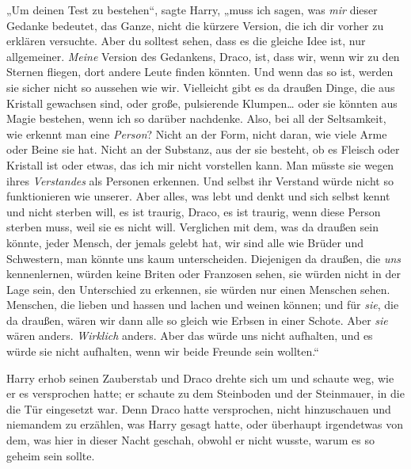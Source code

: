 „Um deinen Test zu bestehen“, sagte Harry, „muss ich sagen, was \emph{mir} dieser Gedanke bedeutet, das Ganze, nicht die kürzere Version, die ich dir vorher zu erklären versuchte. Aber du solltest sehen, dass es die gleiche Idee ist, nur allgemeiner. \emph{Meine} Version des Gedankens, Draco, ist, dass wir, wenn wir zu den Sternen fliegen, dort andere Leute finden könnten. Und wenn das so ist, werden sie sicher nicht so aussehen wie wir. Vielleicht gibt es da draußen Dinge, die aus Kristall gewachsen sind, oder große, pulsierende Klumpen… oder sie könnten aus Magie bestehen, wenn ich so darüber nachdenke. Also, bei all der Seltsamkeit, wie erkennt man eine \emph{Person}? Nicht an der Form, nicht daran, wie viele Arme oder Beine sie hat. Nicht an der Substanz, aus der sie besteht, ob es Fleisch oder Kristall ist oder etwas, das ich mir nicht vorstellen kann. Man müsste sie wegen ihres \emph{Verstandes} als Personen erkennen. Und selbst ihr Verstand würde nicht so funktionieren wie unserer. Aber alles, was lebt und denkt und sich selbst kennt und nicht sterben will, es ist traurig, Draco, es ist traurig, wenn diese Person sterben muss, weil sie es nicht will. Verglichen mit dem, was da draußen sein könnte, jeder Mensch, der jemals gelebt hat, wir sind alle wie Brüder und Schwestern, man könnte uns kaum unterscheiden. Diejenigen da draußen, die \emph{uns} kennenlernen, würden keine Briten oder Franzosen sehen, sie würden nicht in der Lage sein, den Unterschied zu erkennen, sie würden nur einen Menschen sehen. Menschen, die lieben und hassen und lachen und weinen können; und für \emph{sie}, die da draußen, wären wir dann alle so gleich wie Erbsen in einer Schote. Aber \emph{sie} wären anders. \emph{Wirklich} anders. Aber das würde uns nicht aufhalten, und es würde sie nicht aufhalten, wenn wir beide Freunde sein wollten.“

Harry erhob seinen Zauberstab und Draco drehte sich um und schaute weg, wie er es versprochen hatte; er schaute zu dem Steinboden und der Steinmauer, in die die Tür eingesetzt war. Denn Draco hatte versprochen, nicht hinzuschauen und niemandem zu erzählen, was Harry gesagt hatte, oder überhaupt irgendetwas von dem, was hier in dieser Nacht geschah, obwohl er nicht wusste, warum es so geheim sein sollte.


